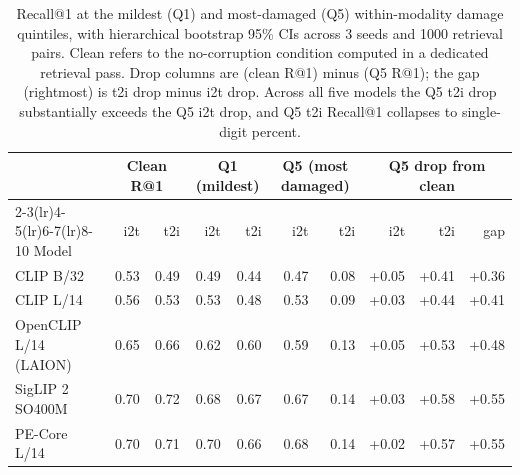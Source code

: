 \begin{table}[h]
\centering
\caption{Recall@1 at the mildest (Q1) and most-damaged (Q5) within-modality damage quintiles, with hierarchical bootstrap 95\% CIs across 3 seeds and 1000 retrieval pairs. Clean refers to the no-corruption condition computed in a dedicated retrieval pass. Drop columns are (clean R@1) minus (Q5 R@1); the gap (rightmost) is t2i drop minus i2t drop. Across all five models the Q5 t2i drop substantially exceeds the Q5 i2t drop, and Q5 t2i Recall@1 collapses to single-digit percent.}
\label{tab:t2_headline}
\footnotesize
\setlength{\tabcolsep}{3pt}
\begin{tabular}{lrrrrrrrrr}
\toprule
 & \multicolumn{2}{c}{Clean R@1} & \multicolumn{2}{c}{Q1 (mildest)} & \multicolumn{2}{c}{Q5 (most damaged)} & \multicolumn{3}{c}{Q5 drop from clean} \\
\cmidrule(lr){2-3}\cmidrule(lr){4-5}\cmidrule(lr){6-7}\cmidrule(lr){8-10}
Model & i2t & t2i & i2t & t2i & i2t & t2i & i2t & t2i & gap \\
\midrule
CLIP B/32 & 0.53 & 0.49 & 0.49 & 0.44 & 0.47 & 0.08 & +0.05 & +0.41 & +0.36 \\
CLIP L/14 & 0.56 & 0.53 & 0.53 & 0.48 & 0.53 & 0.09 & +0.03 & +0.44 & +0.41 \\
OpenCLIP L/14 (LAION) & 0.65 & 0.66 & 0.62 & 0.60 & 0.59 & 0.13 & +0.05 & +0.53 & +0.48 \\
SigLIP 2 SO400M & 0.70 & 0.72 & 0.68 & 0.67 & 0.67 & 0.14 & +0.03 & +0.58 & +0.55 \\
PE-Core L/14 & 0.70 & 0.71 & 0.70 & 0.66 & 0.68 & 0.14 & +0.02 & +0.57 & +0.55 \\
\bottomrule
\end{tabular}
\end{table}